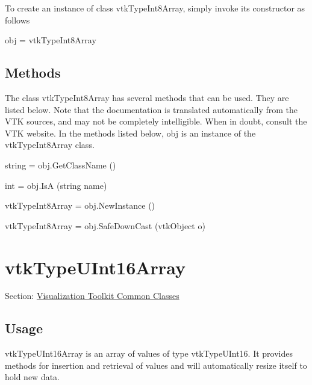 To create an instance of class vtk\-Type\-Int8\-Array, simply invoke its constructor as follows \begin{DoxyVerb}  obj = vtkTypeInt8Array
\end{DoxyVerb}
 \hypertarget{vtkwidgets_vtkxyplotwidget_Methods}{}\subsection{Methods}\label{vtkwidgets_vtkxyplotwidget_Methods}
The class vtk\-Type\-Int8\-Array has several methods that can be used. They are listed below. Note that the documentation is translated automatically from the V\-T\-K sources, and may not be completely intelligible. When in doubt, consult the V\-T\-K website. In the methods listed below, {\ttfamily obj} is an instance of the vtk\-Type\-Int8\-Array class. 
\begin{DoxyItemize}
\item {\ttfamily string = obj.\-Get\-Class\-Name ()}  
\item {\ttfamily int = obj.\-Is\-A (string name)}  
\item {\ttfamily vtk\-Type\-Int8\-Array = obj.\-New\-Instance ()}  
\item {\ttfamily vtk\-Type\-Int8\-Array = obj.\-Safe\-Down\-Cast (vtk\-Object o)}  
\end{DoxyItemize}\hypertarget{vtkcommon_vtktypeuint16array}{}\section{vtk\-Type\-U\-Int16\-Array}\label{vtkcommon_vtktypeuint16array}
Section\-: \hyperlink{sec_vtkcommon}{Visualization Toolkit Common Classes} \hypertarget{vtkwidgets_vtkxyplotwidget_Usage}{}\subsection{Usage}\label{vtkwidgets_vtkxyplotwidget_Usage}
vtk\-Type\-U\-Int16\-Array is an array of values of type vtk\-Type\-U\-Int16. It provides methods for insertion and retrieval of values and will automatically resize itself to hold new data.


